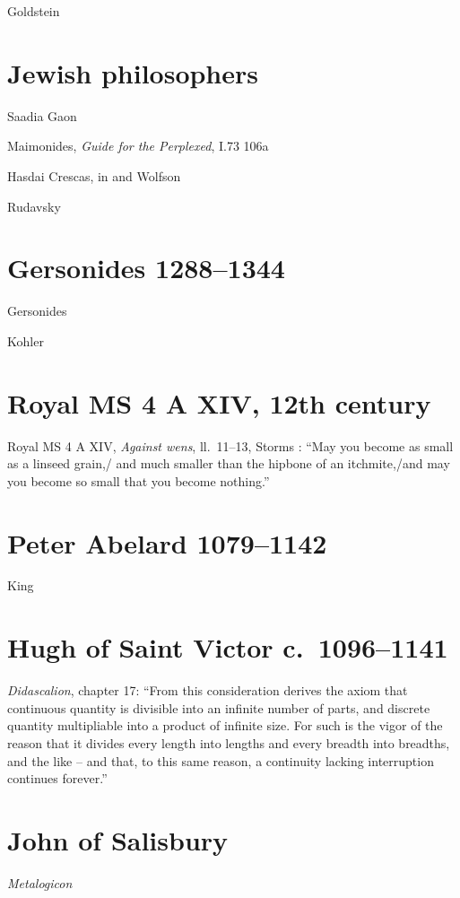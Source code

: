 \documentclass{amsart}
\theoremstyle{definition}
\begin{document}
Goldstein \cite{goldstein}


\section{Jewish philosophers}
Saadia Gaon \cite{gaon}

Maimonides, {\em Guide for the Perplexed}, I.73 106a



Hasdai Crescas, in \cite{harvey} and Wolfson \cite{wolfson1929}

Rudavsky \cite{rudavsky}





\section{Gersonides 1288--1344}
Gersonides \cite{gersonides}

Kohler \cite{kohler}


\section{Royal MS 4 A XIV, 12th century}
Royal MS 4 A XIV, {\em Against wens}, ll.~11--13, Storms \cite[p.~155, no.~4]{storms}: ``May you become as small as a linseed grain,/ and much smaller than the hipbone of an
itchmite,/and may you become so small that you become nothing.''


\section{Peter Abelard 1079--1142}
King \cite[p.~94]{abelard}

\section{Hugh of Saint Victor c.~1096--1141}
{\em Didascalion}, chapter 17: ``From this consideration derives the axiom that continuous quantity is
divisible into an infinite number of parts, and discrete quantity multipliable into a product of infinite
size. For such is the vigor of the reason that it divides every length into lengths and every breadth
into breadths, and the like -- and that, to this same reason, a continuity lacking interruption
continues forever.'' \cite[p.~58]{grant1974}

\section{John of Salisbury}
{\em Metalogicon}
\end{document}

